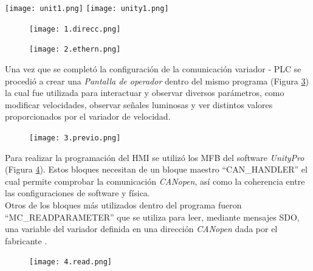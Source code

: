 \begin{center}
	\texttt{[image: unit1.png]}
	\label{fig:uni1}
	\texttt{[image: unity1.png]}
	\label{fig:uni0}
\end{center}

\begin{figure}[h]
	\centering
	\texttt{[image: 1.direcc.png]}
	\label{fig:direcc}
\end{figure}


\begin{figure}[h]
	\centering
	\texttt{[image: 2.ethern.png]}
	\label{fig:inter}
\end{figure}

Una vez que se completó la configuración de la comunicación variador - PLC se procedió a crear una \textit{Pantalla de operador} dentro del mismo programa (Figura \ref{fig:previo})
la cual fue utilizada para interactuar y observar diversos parámetros, como modificar velocidades, observar señales luminosas y ver distintos valores proporcionados por el variador de velocidad.
 
\begin{figure}[H]
	\centering
	\texttt{[image: 3.previo.png]}
	\label{fig:previo}
\end{figure}

Para realizar la programación del HMI se utilizó los MFB del software \textit{UnityPro} (Figura \ref{fig:read}). Estos bloques necesitan de un bloque maestro ``CAN\_HANDLER'' el cual permite comprobar la comunicación \textit{CANopen}, así como la coherencia
entre las configuraciones de software y física.
\\
Otros de los bloques más utilizados dentro del programa fueron ``MC\_READPARAMETER'' que se utiliza para leer, mediante mensajes SDO, una variable del variador definida en una dirección \textit{CANopen} dada por el fabricante \cite{ComManual}.

\begin{figure}[H]
	\centering
	\texttt{[image: 4.read.png]}
	\label{fig:read}
\end{figure}



